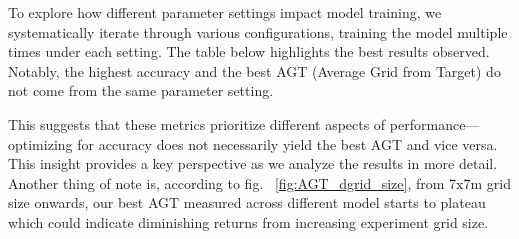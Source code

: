 \documentclass[runningheads]{llncs}
\begin{document}
To explore how different parameter settings impact model training, we systematically iterate through various configurations, training the model multiple times under each setting. The table below highlights the best results observed. Notably, the highest accuracy and the best AGT (Average Grid from Target) do not come from the same parameter setting.



This suggests that these metrics prioritize different aspects of performance—optimizing for accuracy does not necessarily yield the best AGT and vice versa. This insight provides a key perspective as we analyze the results in more detail. Another thing of note is, according to fig. ~\ref{fig:AGT_dgrid_size}, from 7x7m grid size onwards, our best AGT measured across different model starts to plateau which could indicate diminishing returns from increasing experiment grid size.
\end{document}
